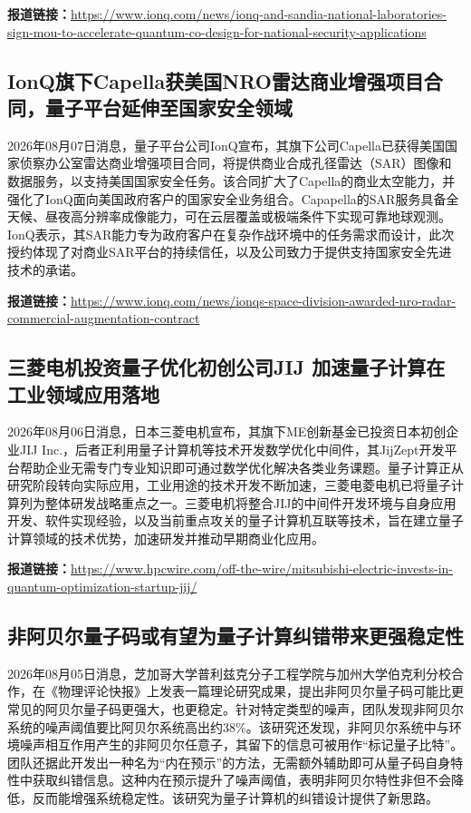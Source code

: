 \documentclass[12pt,a4paper]{ctexart}
\begin{document}
\noindent\textbf{报道链接：}\url{https://www.ionq.com/news/ionq-and-sandia-national-laboratories-sign-mou-to-accelerate-quantum-co-design-for-national-security-applications}

\subsection{ IonQ旗下Capella获美国NRO雷达商业增强项目合同，量子平台延伸至国家安全领域 }

2026年08月07日消息，量子平台公司IonQ宣布，其旗下公司Capella已获得美国国家侦察办公室雷达商业增强项目合同，将提供商业合成孔径雷达（SAR）图像和数据服务，以支持美国国家安全任务。该合同扩大了Capella的商业太空能力，并强化了IonQ面向美国政府客户的国家安全业务组合。Capapella的SAR服务具备全天候、昼夜高分辨率成像能力，可在云层覆盖或极端条件下实现可靠地球观测。IonQ表示，其SAR能力专为政府客户在复杂作战环境中的任务需求而设计，此次授约体现了对商业SAR平台的持续信任，以及公司致力于提供支持国家安全先进技术的承诺。

\noindent\textbf{报道链接：}\url{https://www.ionq.com/news/ionqs-space-division-awarded-nro-radar-commercial-augmentation-contract}

\subsection{ 三菱电机投资量子优化初创公司JIJ 加速量子计算在工业领域应用落地 }

2026年08月06日消息，日本三菱电机宣布，其旗下ME创新基金已投资日本初创企业JIJ Inc.，后者正利用量子计算机等技术开发数学优化中间件，其JijZept开发平台帮助企业无需专门专业知识即可通过数学优化解决各类业务课题。量子计算正从研究阶段转向实际应用，工业用途的技术开发不断加速，三菱电菱电机已将量子计算列为整体研发战略重点之一。三菱电机将整合JIJ的中间件开发环境与自身应用开发、软件实现经验，以及当前重点攻关的量子计算机互联等技术，旨在建立量子计算领域的技术优势，加速研发并推动早期商业化应用。

\noindent\textbf{报道链接：}\url{https://www.hpcwire.com/off-the-wire/mitsubishi-electric-invests-in-quantum-optimization-startup-jij/}

\subsection{ 非阿贝尔量子码或有望为量子计算纠错带来更强稳定性 }

2026年08月05日消息，芝加哥大学普利兹克分子工程学院与加州大学伯克利分校合作，在《物理评论快报》上发表一篇理论研究成果，提出非阿贝尔量子码可能比更常见的阿贝尔量子码更强大，也更稳定。针对特定类型的噪声，团队发现非阿贝尔系统的噪声阈值要比阿贝尔系统高出约38\%。该研究还发现，非阿贝尔系统中与环境噪声相互作用产生的非阿贝尔任意子，其留下的信息可被用作“标记量子比特”。团队还据此开发出一种名为“内在预示”的方法，无需额外辅助即可从量子码自身特性中获取纠错信息。这种内在预示提升了噪声阈值，表明非阿贝尔特性非但不会降低，反而能增强系统稳定性。该研究为量子计算机的纠错设计提供了新思路。
\end{document}

